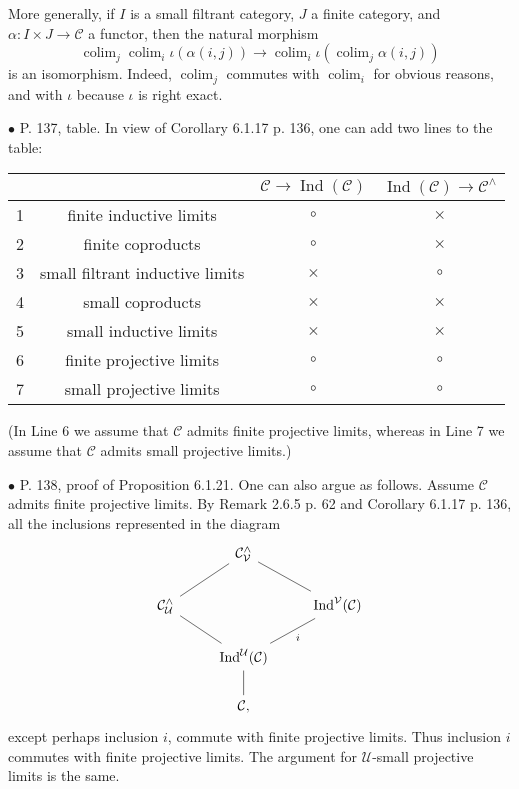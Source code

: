 \documentclass[12pt]{article}
\theoremstyle{remark}%
\newcommand{\bu}{\bullet}
\newcommand{\n}{\noindent}
\newcommand{\C}{\mathcal C}
\newcommand{\U}{\mathcal U}
\newcommand{\V}{\mathcal V}
\DeclareMathOperator*{\co}{colim}
\DeclareMathOperator{\Ind}{Ind}
\begin{document}
More generally, if $I$ is a small filtrant category, $J$ a finite category, and $\alpha:I\times J\to\C$ a functor, then the natural morphism 
$$
\co_j\co_i\iota(\alpha(i,j))\to\co_i\iota\left(\co_j\alpha(i,j)\right) 
$$ 
is an isomorphism. Indeed, $\co_j$ commutes with $\co_i$ for obvious reasons, and with $\iota$ because $\iota$ is right exact. 


\n$\bu$ P. 137, table. In view of Corollary 6.1.17 p. 136, one can add two lines to the table:\bigskip 

\begin{center}
\begin{tabular}{|c|c|c|c|}\hline
&&$\C\to\Ind(\C)$&$\Ind(\C)\to\C^\wedge$\\ \hline
1&finite inductive limits&$\circ$&$\times$\\ \hline
2&finite coproducts&$\circ$&$\times$\\ \hline
3&small filtrant inductive limits&$\times$&$\circ$\\ \hline
4&small coproducts&$\times$&$\times$\\ \hline
5&small inductive limits&$\times$&$\times$\\ \hline
6&finite projective limits&$\circ$&$\circ$\\ \hline
7&small projective limits&$\circ$&$\circ$\\ \hline
\end{tabular}
\end{center}%
\n (In Line 6 we assume that $\C$ admits finite projective limits, whereas in Line 7 we assume that $\C$ admits small projective limits.)
\bigskip 


\n$\bu$ P. 138, proof of Proposition 6.1.21. One can also argue as follows. Assume $\C$ admits finite projective limits. By Remark 2.6.5 p. 62 and Corollary 6.1.17 p. 136, all the inclusions represented in the diagram 
\[
\begin{tikzcd}
{}&\C^\wedge_\V\ar[-]{ld}\ar[-]{rd}\\
\C^\wedge_\U\ar[-]{rd}&&\Ind^\V(\C)\ar[-]{ld}{i}\\
&\Ind^\U(\C)\ar[-]{d}\\
&\C,
\end{tikzcd}
\]
except perhaps inclusion $i$, commute with finite projective limits. Thus inclusion $i$ commutes with finite projective limits. The argument for $\U$-small projective limits is the same. 

\end{document}
